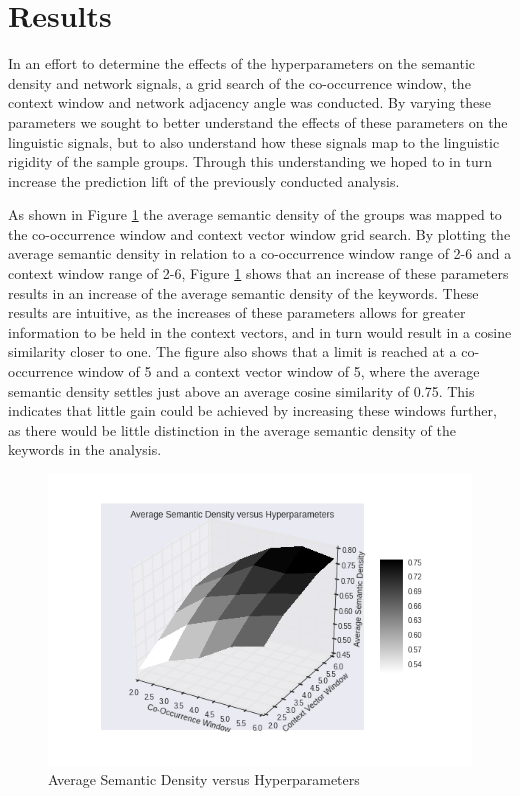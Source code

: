 \documentclass[11pt]{article}
\begin{document}
\section{Results}
\label{results}

In an effort to determine the effects of the hyperparameters on the semantic density and network signals, a grid search of the co-occurrence window, the context window and network adjacency angle was conducted. By varying these parameters we sought to better understand the effects of these parameters on the linguistic signals, but to also understand how these signals map to the linguistic rigidity of the sample groups. Through this understanding we hoped to in turn increase the prediction lift of the previously conducted analysis.

As shown in Figure \ref{fig:SD_surface} the average semantic density of the groups was mapped to the co-occurrence window and context vector window grid search. By plotting the average semantic density in relation to a co-occurrence window range of 2-6 and a context window range of 2-6, Figure \ref{fig:SD_surface} shows that an increase of these parameters results in an increase of the average semantic density of the keywords. These results are intuitive, as the increases of these parameters allows for greater information to be held in the context vectors, and in turn would result in a cosine similarity closer to one. The figure also shows that a limit is reached at a co-occurrence window of 5 and a context vector window of 5, where the average semantic density settles just above an average cosine similarity of 0.75. This indicates that little gain could be achieved by increasing these windows further, as there would be little distinction in the average semantic density of the keywords in the analysis.

\begin{figure}[h]
\begin{center}
\includegraphics[width = \textwidth]{figs/SD_surface}
\caption{Average Semantic Density versus Hyperparameters}
\label{fig:SD_surface}
\end{center}
\end{figure}
\end{document}
